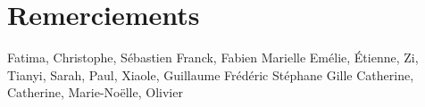 
\chapter{Remerciements}
Fatima, Christophe, Sébastien
Franck, Fabien
Marielle
Emélie, 
Étienne, Zi, Tianyi, Sarah, Paul, Xiaole, Guillaume
Frédéric Stéphane Gille 
Catherine, Catherine, Marie-Noëlle, Olivier